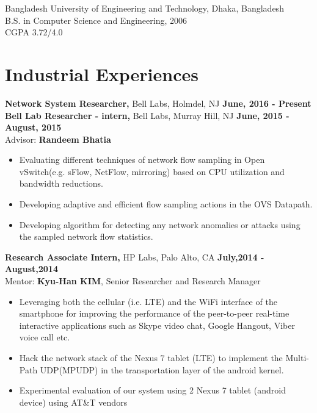 \documentclass[margin]{res}
\begin{document}
\begin{resume}
Bangladesh University of Engineering and Technology, Dhaka, Bangladesh \\
B.S. in Computer Science and Engineering, 2006\\
CGPA 3.72/4.0



\section{Industrial Experiences}

 {\bf Network System Researcher,} Bell Labs, Holmdel, NJ \hfill \textbf{June, 2016 - Present} \\

 {\bf Bell Lab Researcher - intern,} Bell Labs, Murray Hill, NJ \hfill \textbf{June, 2015 - August, 2015} \\
 Advisor: \textbf{Randeem Bhatia} 
 \begin{itemize} \itemsep -2pt  %
 \item Evaluating different techniques of network flow sampling in Open vSwitch(e.g. sFlow, NetFlow, mirroring) based on CPU utilization and bandwidth reductions.
 \item Developing adaptive and efficient flow sampling actions in the OVS Datapath.
 \item Developing algorithm for detecting any network anomalies or attacks using the sampled network flow statistics.
 \end{itemize}

{\bf Research Associate Intern,} HP Labs, Palo Alto, CA \hfill \textbf{July,2014 - August,2014} \\
Mentor: \textbf{Kyu-Han KIM}, Senior Researcher and Research Manager
\begin{itemize} \itemsep -2pt %
\item Leveraging both the cellular (i.e. LTE) and the WiFi interface of the smartphone for improving the performance of the peer-to-peer real-time interactive applications such as Skype video chat, Google Hangout, Viber voice call etc.
\item Hack the network stack of the Nexus 7 tablet (LTE) to implement the Multi-Path UDP(MPUDP) in the transportation layer of the android kernel.
\item Experimental evaluation of our system using 2 Nexus 7 tablet (android device) using AT\&T vendors
\end{itemize}


\end{resume}
\end{document}

